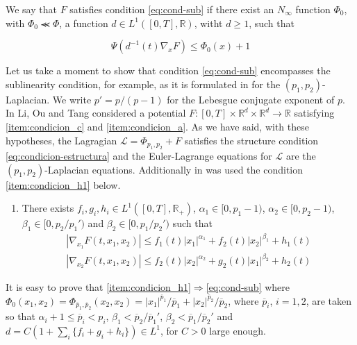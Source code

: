 \documentclass[twoside]{article}
\makeatletter
\theoremstyle{remark}
\newcommand{\labitem}[2]{%
\def\@itemlabel{#1}
\item
\def\@currentlabel{#1}\label{#2}}
\newcommand{\rr}{\mathbb{R}}
\renewcommand{\leq}{\leqslant}
\renewcommand{\geq}{\geqslant}
\newcounter{example}[section]
\makeatother
\begin{document}
We say that $F$ satisfies condition \eqref{eq:cond-sub} if there exist an $N_{\infty}$ function $\Phi_0$, with $\Phi_0 \llcurly \Phi$,
a function $d \in  L^1([0,T],\rr)$, witht $d\geq 1$, such that



\begin{equation}\label{eq:cond-sub}
  \Psi(d^{-1}(t)\nabla_x F)\leq \Phi_0(x)+1\tag{$B$}
\end{equation}

Let us take a moment to show that condition \eqref{eq:cond-sub} encompasses the sublinearity condition, for example, as it is formulated in \cite{li2014periodic} for the $(p_1,p_2)$-Laplacian. We write
$p'=p/(p-1)$ for the Lebesgue conjugate exponent of $p$. In \cite[Th. 1.1.]{li2014periodic} Li, Ou and Tang considered a potential $F:[0,T]\times\rr^d\times\rr^d\to\rr$ satisfying \ref{item:condicion_c} and \ref {item:condicion_a}.  As we have said, with these hypotheses, the Lagragian $\mathcal{L}=\Phi_{p_1,p_2}+F$ satisfies the structure condition \eqref{eq:condicion-estructura} and the Euler-Lagrange equations for $\mathcal{L}$ are the $(p_1,p_2)$-Laplacian equations. Additionally in \cite{li2014periodic} was used the condition \ref{item:condicion_h1} below. 
\begin{enumerate}   
  \labitem{(H1)}{item:condicion_h1} There exists $f_i,g_i,h_i\in L^1([0,T],\rr_+)$, $\alpha_1\in [0,p_1-1)$, $\alpha_2 \in [0,p_2-1)$, $\beta_1\in [0,p_2/p_1')$ and $\beta_2\in [0,p_1/p_2')$ such that
 \begin{equation*}
  \begin{split}
    |\nabla_{x_1}F(t,x_1,x_2)|\leq f_1(t)|x_1|^{\alpha_1}+f_2(t)|x_2|^{\beta_1}+h_1(t)\\
    |\nabla_{x_2}F(t,x_1,x_2)|\leq f_2(t)|x_2|^{\alpha_2}+g_2(t)|x_1|^{\beta_2}+h_2(t)
  \end{split}
 \end{equation*}

\end{enumerate}

It is easy to prove that \eqref{item:condicion_h1}$\Rightarrow$\eqref{eq:cond-sub} where
$\Phi_0(x_1,x_2)=\Phi_{\overline{p}_1,\overline{p}_2}(x_2,x_2)=|x_1|^{\overline{p}_1}/\overline{p}_1+|x_2|^{\overline{p}_2}/\overline{p}_2$, where $\overline{p}_i$, $i=1,2$, are taken so that  $\alpha_i+1\leq \overline{p}_i<p_i$, $\beta_1<\overline{p}_2/\overline{p}_1'$, $\beta_2<\overline{p}_1/\overline{p}_2'$ and $d=C(1+\sum_i \{f_i+g_i+h_i\})\in L^1$, for $C>0$ large enough. 
\end{document}
